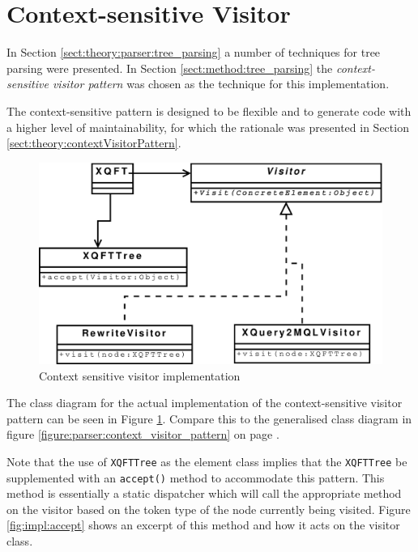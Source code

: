 \section{Context-sensitive Visitor}
\label{sect:impl:context_sens_visitor}
In Section \ref{sect:theory:parser:tree_parsing} a number of techniques for
tree parsing were presented. In Section \ref{sect:method:tree_parsing} the
\textit{context-sensitive visitor pattern} was chosen as the technique for this
implementation. 

The context-sensitive pattern is designed to be flexible and to generate code
with a higher level of maintainability, for which the rationale was presented
in Section \ref{sect:theory:contextVisitorPattern}. 

\begin{figure}[htp]
\begin{center}
  \includegraphics[scale=0.5]{diagrams/context_visitor_pattern_impl}
  \caption{Context sensitive visitor implementation}
  \label{fig:impl:context_sens_visitor_impl}
\end{center}
\end{figure}

The class diagram for the actual implementation of the context-sensitive
visitor pattern can be seen in Figure \ref{fig:impl:context_sens_visitor_impl}.
Compare this to the generalised class diagram in figure
\ref{figure:parser:context_visitor_pattern} on page
\pageref{figure:parser:context_visitor_pattern}.

Note that the use of \texttt{XQFTTree} as the element class implies that the
\texttt{XQFTTree} be supplemented with an \texttt{accept()} method to
accommodate this pattern. This method is essentially a static dispatcher which
will call the appropriate method on the visitor based on the token type of the
node currently being visited. Figure \ref{fig:impl:accept} shows an excerpt of this method and
how it acts on the visitor class.

